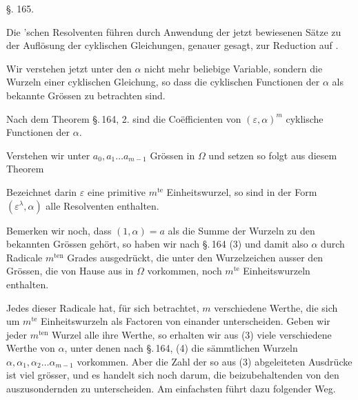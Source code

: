 
\begin{center}
§. 165.

\end{center}

Die 'schen Resolventen führen durch Anwendung der jetzt bewiesenen Sätze zu der Auflösung der cyklischen Gleichungen, genauer gesagt, zur Reduction auf .

Wir verstehen jetzt unter den $\alpha$ nicht mehr beliebige Variable, sondern die Wurzeln einer cyklischen Gleichung, so dass die cyklischen Functionen der $\alpha$ als bekannte Grössen zu betrachten sind.

Nach dem Theorem \S.\,164, 2. sind die Coëfficienten von $(\varepsilon,\alpha)^m$ cyklische Functionen der $\alpha$.

Verstehen wir unter $a_0, a_1\dots a_{m-1}$ Grössen in $\Omega$ und setzen
so folgt aus diesem Theorem

Bezeichnet darin $\varepsilon$ eine primitive $m^{\mathrm{te}}$ Einheitswurzel, so sind in der Form $(\varepsilon^\lambda,\alpha)$ alle Resolventen enthalten.

Bemerken wir noch, dass $(1,\alpha) = a$ als die Summe der Wurzeln zu den bekannten Grössen gehört, so haben wir nach \S.\,164 (3)
und damit also $\alpha$ durch Radicale $m^{\mathrm{ten}}$ Grades ausgedrückt, die unter den Wurzelzeichen ausser den Grössen, die von Hause aus in $\Omega$ vorkommen, noch $m^{\mathrm{te}}$ Einheitswurzeln enthalten.

Jedes dieser Radicale hat, für sich betrachtet, $m$ verschiedene Werthe, die sich um $m^{\mathrm{te}}$ Einheitswurzeln als Factoren von einander unterscheiden. Geben wir jeder $m^{\mathrm{ten}}$ Wurzel alle ihre Werthe, so erhalten wir aus (3) viele verschiedene Werthe von $\alpha$, unter denen nach \S.\,164, (4) die sämmtlichen Wurzeln $\alpha, \alpha_1, \alpha_2\dots\alpha_{m-1}$ vorkommen. Aber die Zahl der so aus (3) abgeleiteten Ausdrücke ist viel grösser, und es handelt sich noch darum, die beizubehaltenden von den auszusondernden zu unterscheiden. Am einfachsten führt dazu folgender Weg.
